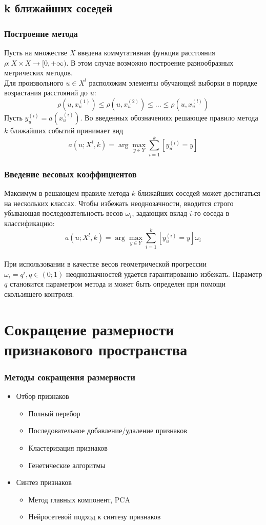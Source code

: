\documentclass{beamer}
\begin{document}
\subsection{k ближайших соседей}
\begin{frame}
\frametitle{Построение метода}
Пусть на множестве $X$ введена коммутативная функция расстояния $\rho:X\times X\rightarrow[0,+\infty)$. В этом случае возможно построение разнообразных метрических методов.\\
Для произвольного $u\in X^l$ расположим элементы обучающей выборки в порядке возрастания расстояний до $u$:
$$\rho(u,x_u^{(1)})\le\rho(u,x_u^{(2)})\le ... \le \rho(u, x_u^{(l)})$$
Пусть $y_u^{(i)}=a(x_u^{(i)})$. Во введенных обозначениях решающее правило метода $k$ ближайших событий принимает вид $$a(u; X^l, k)=\arg\max\limits_{y \in Y}\sum\limits_{i=1}^{k}[y_u^{(i)}=y]$$
\end{frame} 

\begin{frame}
\frametitle{Введение весовых коэффициентов}
Максимум в решающем правиле метода $k$ ближайших соседей может достигаться на нескольких классах. Чтобы избежать неоднозачности, вводится строго убывающая последовательность весов $\omega_i$, задающих вклад $i$-го соседа в классификацию:
$$a(u; X^l, k)=\arg\max\limits_{y \in Y}\sum\limits_{i=1}^{k}[y_u^{(i)}=y]\omega_i$$\\
При использовании в качестве весов геометрической прогрессии $\omega_i=q^i, q\in(0;1)$ неоднозначностей удается гарантированно избежать. Параметр $q$ становится параметром метода и может быть определен при помощи скользящего контроля.
\end{frame} 

\section{Сокращение размерности признакового пространства}

\begin{frame}
\frametitle{Методы сокращения размерности}
\begin{itemize}
	\item{Отбор признаков}
		\begin{itemize}
		\item{Полный перебор}
		\item{Последовательное добавление/удаление признаков}
		\item{Кластеризация признаков}
		\item{Генетические алгоритмы}
		\end{itemize}
	\item{Синтез признаков}
		\begin{itemize}
		\item{Метод главных компонент, PCA}
		\item{Нейросетевой подход к синтезу признаков}
		\end{itemize}
\end{itemize}
\end{frame}
\end{document}
